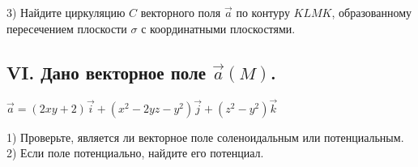 \documentclass[12pt]{article}
\begin{document}
3) Найдите циркуляцию $C$ векторного поля $\vec{a}$ по контуру $K L M K$, образованному пересечением плоскости $\sigma$ с координатными плоскостями.\\

\subsection*{VI. Дано векторное поле $\vec{a}(M)$.}

$\vec{a}=(2 x y+2) \vec{i}+\left(x^{2}-2 y z-y^{2}\right) \vec{j}+\left(z^{2}-y^{2}\right) \vec{k}$\vspace{2.5mm}

1) Проверьте, является ли векторное поле соленоидальным или потенциальным.\\



2) Если поле потенциально, найдите его потенциал.\\\
\end{document}
